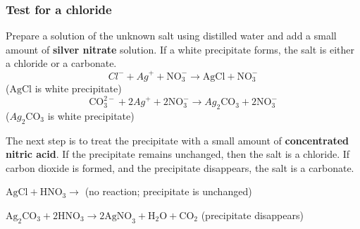             \subsubsection{ Test for a chloride}
            \nopagebreak
        \label{m38719*id341138}Prepare a solution of the unknown salt using distilled water and add a small amount of \textbf{silver nitrate} solution. If a white precipitate forms, the salt is either a chloride or a carbonate.
        \label{m38719*id341148}\nopagebreak\noindent{}
    \begin{equation}
    {Cl}^{-}+{Ag}^{+}+\mathrm{NO}_{3}^{-}\to \mathrm{AgCl}+\mathrm{NO}_{3}^{-}\tag{17.24}
      \end{equation}
     ($\mathrm{AgCl}$ is white precipitate)
        \label{m38719*id341211}\nopagebreak\noindent{}
    \begin{equation}
    \mathrm{CO}_{3}^{2-}+2{Ag}^{+}+2\mathrm{NO}_{3}^{-}\to {Ag}_{2}{\mathrm{CO}}_{3}+2\mathrm{NO}_{3}^{-}\tag{17.25}
      \end{equation}
    (${Ag}_{2}{\mathrm{CO}}_{3}$ is white precipitate)\par 
        \label{m38719*id341323}The next step is to treat the precipitate with a small amount of \textbf{concentrated nitric acid}. If the precipitate remains unchanged, then the salt is a chloride. If carbon dioxide is formed, and the precipitate disappears, the salt is a carbonate.\par 
        \label{m38719*id341334}$\mathrm{AgCl}+{\mathrm{HNO}}_{3}\to $ (no reaction; precipitate is unchanged)\par 
        \label{m38719*id341361}${\mathrm{Ag}}_{2}{\mathrm{CO}}_{3}+2{\mathrm{HNO}}_{3}\to 2{\mathrm{AgNO}}_{3}+{\mathrm{H}}_{2}\mathrm{O}+{\mathrm{CO}}_{2}$ (precipitate disappears)\par 
      \label{m38719*uid71}
